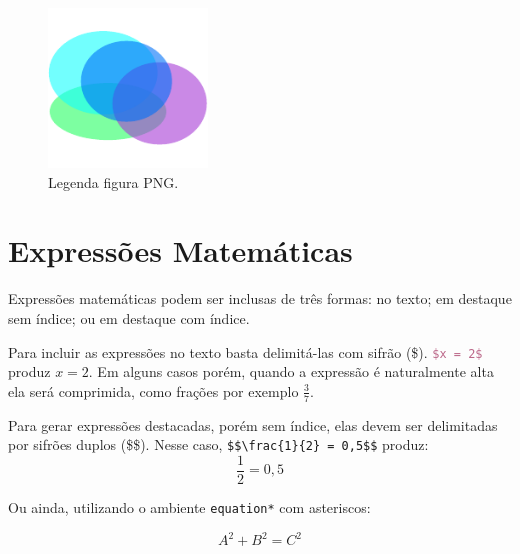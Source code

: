 
    \begin{figure}[htb]
        \centering
        \includegraphics[width=120pt]{images/figure.pdf}
        \caption{Legenda figura PNG.}
        \label{fig:coluna_dupla}
    \end{figure}
        
    \begin{multicols}{2}
        \lipsum[1][1-10]
    \end{multicols}


\section{Expressões Matemáticas}
\label{sec:exmatematicas}

    Expressões matemáticas podem ser inclusas de três formas:
    no texto; em destaque sem índice; ou em destaque com índice.


    Para incluir as expressões no texto basta delimitá-las com sifrão (\$).
    \lstinline[language=TeX,style=code]|$x = 2$| produz $x = 2$.
    Em alguns casos porém, quando a expressão é naturalmente alta ela será comprimida, como frações por exemplo $\frac{3}{7}$.


    Para gerar expressões destacadas, porém sem índice, elas devem ser delimitadas por sifrões duplos (\$\$).
    Nesse caso, \lstinline[language=teX,style=code]|$$\frac{1}{2} = 0,5$$| produz:
    $$\frac{1}{2} = 0,5$$

    Ou ainda, utilizando o ambiente \lstinline[language=TeX,style=code]|equation*| com asteriscos:
    
    \begin{equation*}
        A^{2} + B^{2} = C^{2}
    \end{equation*}


